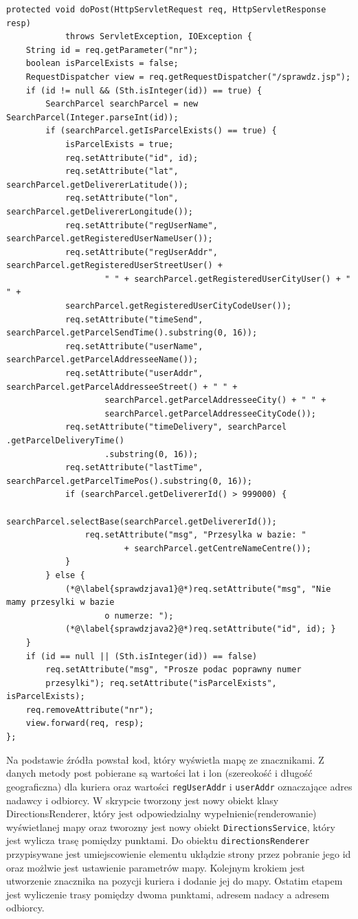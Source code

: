 \documentclass[eng,printmode,oneside]{mgr}
\begin{document}
\begin{lstlisting}[caption=Fragment klasy Sprawdz.Java\,
metoda doPost(),label=sprawdz.java]
protected void doPost(HttpServletRequest req, HttpServletResponse resp)
			throws ServletException, IOException {
	String id = req.getParameter("nr");
	boolean isParcelExists = false;
	RequestDispatcher view = req.getRequestDispatcher("/sprawdz.jsp");
	if (id != null && (Sth.isInteger(id)) == true) {
		SearchParcel searchParcel = new SearchParcel(Integer.parseInt(id));
		if (searchParcel.getIsParcelExists() == true) {
			isParcelExists = true;
			req.setAttribute("id", id);
			req.setAttribute("lat", searchParcel.getDelivererLatitude());
			req.setAttribute("lon", searchParcel.getDelivererLongitude());
			req.setAttribute("regUserName",	searchParcel.getRegisteredUserNameUser());
			req.setAttribute("regUserAddr",	searchParcel.getRegisteredUserStreetUser() +
					" " + searchParcel.getRegisteredUserCityUser() + " " +
			searchParcel.getRegisteredUserCityCodeUser()); 
			req.setAttribute("timeSend", searchParcel.getParcelSendTime().substring(0, 16));
			req.setAttribute("userName", searchParcel.getParcelAddresseeName());
			req.setAttribute("userAddr", searchParcel.getParcelAddresseeStreet() + " " +
					searchParcel.getParcelAddresseeCity() + " "	+ 
					searchParcel.getParcelAddresseeCityCode());
			req.setAttribute("timeDelivery", searchParcel .getParcelDeliveryTime()
					.substring(0, 16)); 
			req.setAttribute("lastTime", searchParcel.getParcelTimePos().substring(0, 16));
			if (searchParcel.getDelivererId() > 999000) {
				searchParcel.selectBase(searchParcel.getDelivererId());
				req.setAttribute("msg", "Przesylka w bazie: "
						+ searchParcel.getCentreNameCentre());
			}
		} else {
			(*@\label{sprawdzjava1}@*)req.setAttribute("msg", "Nie mamy przesylki w bazie
					o numerze: "); 
			(*@\label{sprawdzjava2}@*)req.setAttribute("id", id); }
	}
	if (id == null || (Sth.isInteger(id)) == false)
		req.setAttribute("msg", "Prosze podac poprawny numer
		przesylki"); req.setAttribute("isParcelExists", isParcelExists);
	req.removeAttribute("nr");
	view.forward(req, resp);
};
\end{lstlisting}


Na podstawie źródła \cite{developer.google.maps} powstał kod, który wyświetla
mapę ze znacznikami. Z danych metody post pobierane są wartości lat i lon
(szereokość i długość geograficzna) dla kuriera oraz wartości
\texttt{regUserAddr} i \texttt{userAddr} oznaczające adres nadawcy i odbiorcy. W
skrypcie tworzony jest nowy obiekt klasy DirectionsRenderer, który jest odpowiedzialny
wypełnienie(renderowanie) wyświetlanej mapy oraz tworozny jest nowy obiekt
\texttt{DirectionsService}, który jest wylicza trasę pomiędzy punktami.
Do obiektu \texttt{directionsRenderer} przypisywane jest umiejscowienie elementu
ukłądzie strony przez pobranie jego id oraz możlwie jest ustawienie parametrów mapy.
Kolejnym krokiem jest utworzenie znacznika na pozycji kuriera i dodanie jej do
mapy. Ostatim etapem jest wyliczenie trasy pomiędzy dwoma punktami, adresem
nadacy a adresem odbiorcy.
\end{document}
